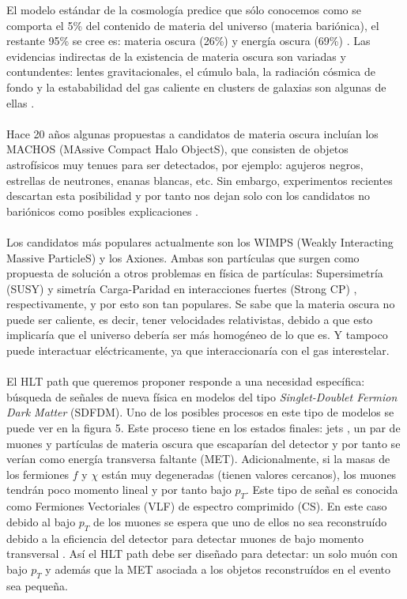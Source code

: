 El modelo estándar de la cosmología predice que sólo conocemos como se comporta el 5\% del contenido de materia del universo (materia bariónica), el restante 95\% se cree es: materia oscura (26\%) y energía oscura (69\%) \cite{Ade:2015xua}. Las evidencias indirectas de la existencia de materia oscura son variadas y contundentes: lentes gravitacionales, el cúmulo bala, la radiación cósmica de fondo y la estababilidad del gas caliente en clusters de galaxias son algunas de ellas \cite{Freese:2017idy}. 
\\
\\
Hace 20 años algunas propuestas a candidatos de materia oscura incluían los MACHOS (MAssive Compact Halo ObjectS), que consisten de objetos astrofísicos muy tenues para ser detectados, por ejemplo: agujeros negros, estrellas de neutrones, enanas blancas, etc. Sin embargo, experimentos recientes descartan esta posibilidad y por tanto nos dejan solo con los candidatos no bariónicos como posibles explicaciones \cite{Freese:1999ge,Fields:1999ar}.
\\
\\
Los candidatos más populares actualmente son los WIMPS (Weakly Interacting Massive ParticleS) y los Axiones. Ambas son partículas que surgen como propuesta de solución a otros problemas en física de partículas: Supersimetría (SUSY) \cite{SUSY} y simetría Carga-Paridad en interacciones fuertes (Strong CP) \cite{StrongCP}, respectivamente, y por esto son tan populares. Se sabe que la materia oscura no puede ser caliente, es decir, tener velocidades relativistas, debido a que esto implicaría que el universo debería ser más homogéneo de lo que es. Y tampoco puede interactuar eléctricamente, ya que interaccionaría con el gas interestelar. 
\\
\\
El HLT path que queremos proponer responde a una necesidad específica: búsqueda de señales de nueva física en modelos del tipo \textit{Singlet-Doublet Fermion Dark Matter} (SDFDM)\cite{1475-7516-2016-03-048}. Uno de los posibles procesos en este tipo de modelos se puede ver en la figura 5. Este proceso tiene en los estados finales: jets , un par de muones y partículas de materia oscura que escaparían del detector y por tanto se verían como energía transversa faltante (MET). Adicionalmente, si la masas de los fermiones $f$ y $\chi$ están muy degeneradas (tienen valores cercanos), los muones tendrán poco momento lineal y por tanto bajo $p_T$. Este tipo de señal es conocida como Fermiones Vectoriales (VLF) de espectro comprimido (CS). En este caso debido al bajo $p_T$ de los muones se espera que uno de ellos no sea reconstruído debido a la eficiencia del detector para detectar muones de bajo momento transversal \cite{Chatrchyan:2012xi}. Así el HLT path debe ser diseñado para detectar: un solo muón con bajo $p_T$ y además que la MET asociada a los objetos reconstruídos en el evento sea pequeña.
